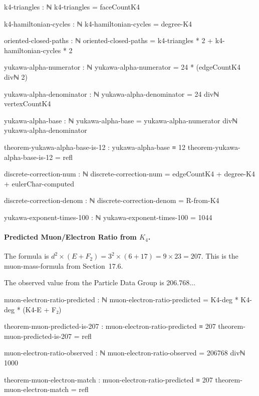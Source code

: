 \documentclass[11pt,a4paper]{book}
\begin{document}
\begin{code}
k4-triangles : ℕ
k4-triangles = faceCountK4

k4-hamiltonian-cycles : ℕ
k4-hamiltonian-cycles = degree-K4
\end{code}

\begin{code}
oriented-closed-paths : ℕ
oriented-closed-paths = k4-triangles * 2 + k4-hamiltonian-cycles * 2

\end{code}

\begin{code}
yukawa-alpha-numerator : ℕ
yukawa-alpha-numerator = 24 * (edgeCountK4 divℕ 2)

yukawa-alpha-denominator : ℕ
yukawa-alpha-denominator = 24 divℕ vertexCountK4

yukawa-alpha-base : ℕ
yukawa-alpha-base = yukawa-alpha-numerator divℕ yukawa-alpha-denominator

theorem-yukawa-alpha-base-is-12 : yukawa-alpha-base ≡ 12
theorem-yukawa-alpha-base-is-12 = refl
\end{code}

\begin{code}
discrete-correction-num : ℕ
discrete-correction-num = edgeCountK4 + degree-K4 + eulerChar-computed

discrete-correction-denom : ℕ
discrete-correction-denom = R-from-K4

yukawa-exponent-times-100 : ℕ
yukawa-exponent-times-100 = 1044


\end{code}

\paragraph{Predicted Muon/Electron Ratio from $K_4$.}
The formula is $d^2 \times (E + F_2) = 3^2 \times (6 + 17) = 9 \times 23 = 207$.
This is the muon-mass-formula from Section~17.6.

The observed value from the Particle Data Group is 206.768...

\begin{code}
muon-electron-ratio-predicted : ℕ
muon-electron-ratio-predicted = K4-deg * K4-deg * (K4-E + F₂)

theorem-muon-predicted-is-207 : muon-electron-ratio-predicted ≡ 207
theorem-muon-predicted-is-207 = refl

muon-electron-ratio-observed : ℕ
muon-electron-ratio-observed = 206768 divℕ 1000

theorem-muon-electron-match : muon-electron-ratio-predicted ≡ 207
theorem-muon-electron-match = refl
\end{code}
\end{document}
